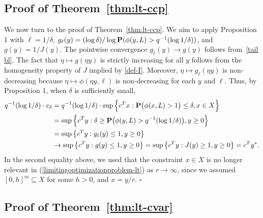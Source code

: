 \documentclass[a4paper, a4wide, 10pt, reqno]{amsart}
\theoremstyle{plain}
\renewcommand{\qed}{\hfill$\square$}
\begin{document}
\subsection{Proof of Theorem~\ref{thm:lt-ccp}}\label{sec:proof-1}



\smallskip
We now turn to the proof of Theorem~\ref{thm:lt-ccp}.
We aim to apply Proposition 1 with $\ell=1/\delta$, 
$g_\ell(y) = (\log \delta)/ \log {\bf P}(\phi(y,L) > q^{-1}(\log 1/\delta))$, and $g(y)=1/J(y)$. The pointwise convergence $g_\ell(y)\rightarrow g(y)$ follows from~\eqref{tail bl}.
The fact that $\eta\mapsto g(\eta y)$ is strictly increasing for all $y$ follows from the homogeneity property of $J$ implied by \eqref{def-I}.
Moreover, $\eta\mapsto g_\ell(\eta y)$ is non-decreasing because $\eta \mapsto \phi(\eta y, \ell)$ is non-decreasing for each $y$ and $\ell$. Thus, by Proposition 1, when $\delta$ is sufficiently small,
\[
\begin{aligned}
q^{-1}(\log1/\delta)\cdot v_\delta&=q^{-1}(\log1/\delta)\cdot\sup\Big\{c^Tx: {\bf P}\big(\phi(x, L)>1\big)\le \delta, x\in X\Big\} \\&=
\sup\Big\{c^Ty: \delta\ge {\bf P}\big(\phi(y,L)>q^{-1}(\log 1/\delta)\big), y\ge 0\Big\}\\
&=\sup\big\{c^Ty: g_\ell(y)\le 1, y\ge 0\big\} \\
&\to \sup\big\{c^Ty: g(y)\le 1, y\ge 0\big\}=\sup\big\{c^Ty: J(y)\ge 1, y\ge 0\big\}=c^Ty^\ast.
\end{aligned}
\]
In the second equality above, we used that the constraint $x\in X$ is no longer relevant in (\ref{limitingoptimizationproblem-lt}) as $r\rightarrow\infty$, since we assumed $[0,h]^m \subseteq X$ for some $h>0$, and $x=y/r$.
  \qed

\subsection{Proof of Theorem~\ref{thm:lt-cvar}}\label{sec-proof2}
\end{document}
